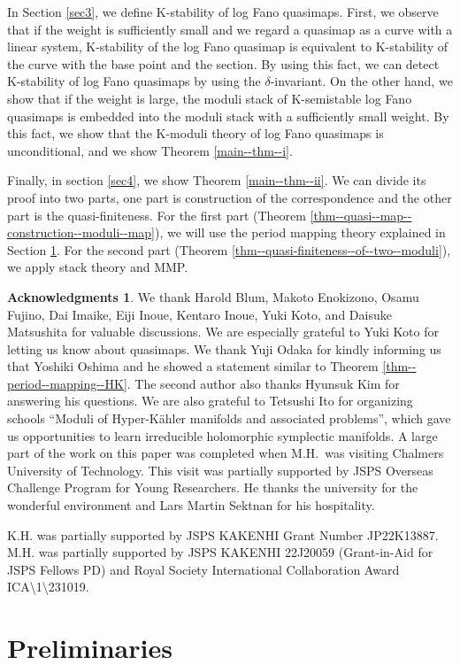 \documentclass[12pt,twoside]{amsart}
\theoremstyle{definition}
\newtheorem*{ack}{Acknowledgments}
\begin{document}
In Section \ref{sec3}, we define K-stability of log Fano quasimaps.
First, we observe that if the weight is sufficiently small and we regard a quasimap as a curve with a linear system, K-stability of the log Fano quasimap is equivalent to K-stability of the curve with the base point and the section.
By using this fact, we can detect K-stability of log Fano quasimaps by using the $\delta$-invariant.
On the other hand, we show that if the weight is large, the moduli stack of K-semistable log Fano quasimaps is embedded into the moduli stack with a sufficiently small weight.
By this fact, we show that the K-moduli theory of log Fano quasimaps is unconditional, and we show Theorem \ref{main--thm--i}.

Finally, in section \ref{sec4}, we show Theorem \ref{main--thm--ii}.
We can divide its proof into two parts, one part is construction of the correspondence and the other part is the quasi-finiteness.
For the first part (Theorem \ref{thm--quasi--map--construction--moduli--map}), we will use the period mapping theory explained in Section \ref{sec--pre}.
For the second part (Theorem \ref{thm--quasi-finiteness--of--two--moduli}), we apply stack theory and MMP.
\begin{ack} 
We thank Harold Blum, Makoto Enokizono, Osamu Fujino, Dai Imaike, Eiji Inoue, Kentaro Inoue, Yuki Koto, and Daisuke Matsushita for valuable discussions.
We are especially grateful to Yuki Koto for letting us know about quasimaps.
We thank Yuji Odaka for kindly informing us that Yoshiki Oshima and he showed a statement similar to Theorem \ref{thm--period--mapping--HK}. 
The second author also thanks Hyunsuk Kim for answering his questions.
We are also grateful to Tetsushi Ito for organizing schools ``Moduli of Hyper-K\"ahler manifolds and associated problems'', which gave us opportunities to learn irreducible holomorphic symplectic manifolds.
A large part of the work on this paper was completed when M.H.~was visiting Chalmers University of Technology.
This visit was partially supported by JSPS Overseas Challenge Program for Young Researchers.
 He thanks the university for the wonderful environment and Lars Martin Sektnan for his hospitality.

K.H. was partially supported by JSPS KAKENHI Grant Number JP22K13887. 
    M.H. was partially supported by JSPS KAKENHI 	22J20059  
(Grant-in-Aid for JSPS Fellows PD) and Royal Society International Collaboration Award ICA\textbackslash1\textbackslash231019.
\end{ack}
\section{Preliminaries}\label{sec--pre}
\end{document}
